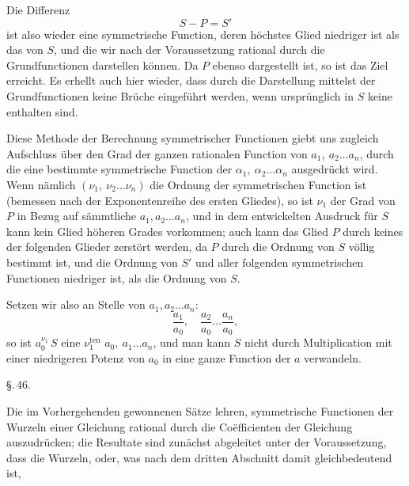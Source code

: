Die Differenz
\[
S - P = S'
\]
ist also wieder eine symmetrische Function, deren h\"ochstes Glied
niedriger ist als das von $S$, und die wir nach der Voraus\-setzung
rational durch die Grundfunctionen darstellen k\"onnen.
Da $P$ ebenso dargestellt ist, so ist das Ziel erreicht. Es erhellt
auch hier wieder, dass durch die Darstellung mittelst der Grund\-functionen
keine Br\"uche eingef\"uhrt werden, wenn urspr\"unglich
in $S$ keine enthalten sind.

Diese Methode der Berechnung symmetrischer Functionen
giebt uns zugleich Aufschluss \"uber den Grad der ganzen ratio\-nalen
Function von $a_1,\ a_2 \ldots a_n$, durch die eine bestimmte
symmetrische Function der $\alpha_1,\ \alpha_2 \ldots \alpha_n$ ausgedr\"uckt wird.
Wenn n\"amlich $(\nu_1,\ \nu_2 \ldots \nu_n)$ die Ordnung der symmetrischen
Function ist (bemessen nach der Exponentenreihe des ersten
Gliedes), so ist $\nu_1$ der Grad von $P$ in Bezug auf s\"ammtliche
$a_1, a_2 \ldots a_n$, und in dem entwickelten Ausdruck f\"ur $S$ kann kein
Glied h\"oheren Grades vorkommen; auch kann das Glied $P$ durch
keines der folgenden Glieder zerst\"ort werden, da $P$ durch die
Ordnung von $S$ v\"ollig bestimmt ist, und die Ordnung von $S'$
und aller folgenden symmetrischen Functionen niedriger ist, als
die Ordnung von $S$.

Setzen wir also an Stelle von $a_1, a_2 \ldots a_n$:
\[
\frac{a_1}{a_0},\quad \frac{a_2}{a_0} \ldots \frac{a_n}{a_0},
\]
so ist $a_0^{\nu_1}\,S$ eine 
$\nu_1^{\mathrm{ten}}$  $a_0,\ a_1 \ldots a_n$, und man kann $S$ nicht durch Multiplication
mit einer niedrigeren Potenz von $a_0$ in eine ganze Function der
$a$ verwandeln.

\begin{center}
\S.\,46.

\end{center}

Die im Vorhergehenden gewonnenen S\"atze lehren, sym\-metrische
Functionen der Wurzeln einer Gleichung rational durch
die Co\"efficienten der Gleichung auszudr\"ucken; die Resultate sind
zun\"achst abgeleitet unter der Voraussetzung, dass die Wurzeln,
oder, was nach dem dritten Abschnitt damit gleichbedeutend ist,
